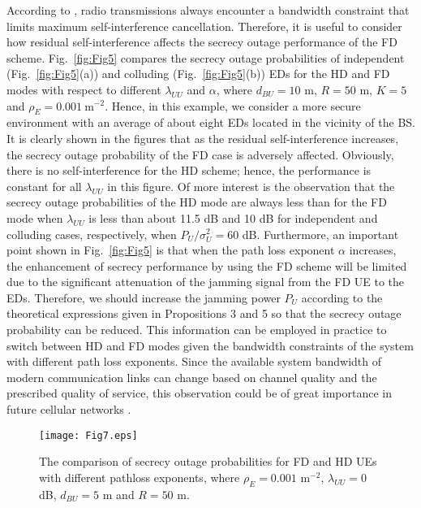 \documentclass[10pt]{IEEEtran}
\begin{document}
According to \cite{S.H14}, radio transmissions always encounter a bandwidth constraint that limits maximum self-interference cancellation.  Therefore, it is useful to consider how residual self-interference affects the secrecy outage performance of the FD scheme. Fig.~\ref{fig:Fig5} compares the secrecy outage probabilities of independent (Fig.~\ref{fig:Fig5}(a)) and colluding  (Fig.~\ref{fig:Fig5}(b)) EDs for the HD and FD modes with respect to different $\lambda_{UU}$ and $\alpha$, where $d_{BU} = 10$ m, $R= 50$ m, $K = 5$ and $\rho_E = 0.001~\textrm{m}^{-2}$. Hence, in this example, we consider a more secure environment with an average of about eight EDs located in the vicinity of the BS. It is clearly shown in the figures that as the residual self-interference increases, the secrecy outage probability of the FD case is adversely affected. Obviously, there is no self-interference for the HD scheme; hence, the performance is constant for all $\lambda_{UU}$ in this figure. Of more interest is the observation that the secrecy outage probabilities of the HD mode are always less than for the FD mode when $\lambda_{UU}$ is less than about 11.5 dB and 10 dB for independent and colluding cases, respectively, when $P_U/\sigma^2_{U} = 60$ dB.  Furthermore, an important point shown in Fig.~\ref{fig:Fig5} is that when the path loss exponent $\alpha$ increases, the enhancement of secrecy performance by using the FD scheme will be limited due to the significant attenuation of the jamming signal from the FD UE to the EDs. Therefore, we should increase the jamming power $P_U$ according to the theoretical expressions given in Propositions 3 and 5 so that the secrecy outage probability can be reduced. This information can be employed in practice to switch between HD and FD modes given the bandwidth constraints of the system with different path loss exponents. Since the available system bandwidth of modern communication links can change based on channel quality and the prescribed quality of service, this observation could be of great importance in future cellular networks \cite{S.H14}.

\begin{figure}[t]
\centering
\texttt{[image: Fig7.eps]}
\caption{\small The comparison of secrecy outage probabilities for FD and HD UEs with different pathloss exponents, where $\rho_E = 0.001$ $\textrm{m}^{-2}$, $\lambda_{UU} = 0$ dB, $d_{BU} = 5$ m and $R = 50$ m.}
\label{fig:Fig6}
\end{figure}
\end{document}
